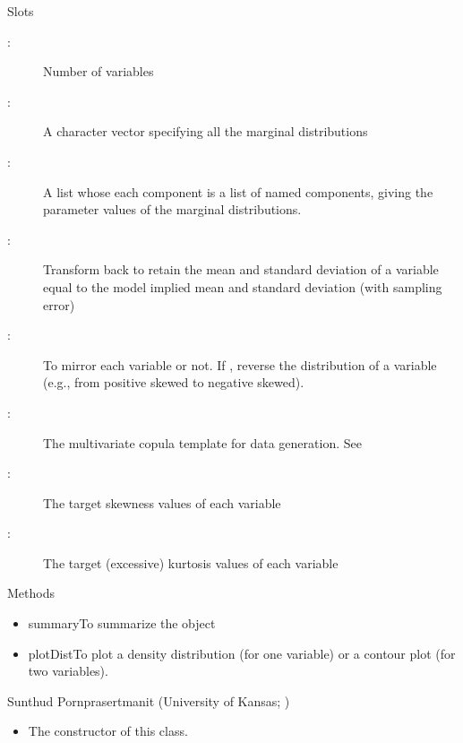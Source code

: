 \documentclass[a4paper]{book}
\begin{document}
\begin{Section}{Slots}
\begin{description}

\item[:] Number of variables
\item[:] A character vector specifying all the marginal distributions
\item[:] A list whose each component is a list of named components, giving the parameter values of the marginal distributions.
\item[:] Transform back to retain the mean and standard deviation of a variable equal to the model implied mean and standard deviation (with sampling error)
\item[:] To mirror each variable or not. If , reverse the distribution of a variable (e.g., from positive skewed to negative skewed).
\item[:] The multivariate copula template for data generation. See 
\item[:] The target skewness values of each variable
\item[:] The target (excessive) kurtosis values of each variable

\end{description}

\end{Section}
%
\begin{Section}{Methods}
\begin{itemize}

\item summaryTo summarize the object
\item plotDistTo plot a density distribution (for one variable) or a contour plot (for two variables).

\end{itemize}

\end{Section}
%
\begin{Author}\relax
Sunthud Pornprasertmanit (University of Kansas; )
\end{Author}
%
\begin{SeeAlso}\relax
\begin{itemize}

\item {} The constructor of this class.	

\end{itemize}

\end{SeeAlso}
\end{document}
